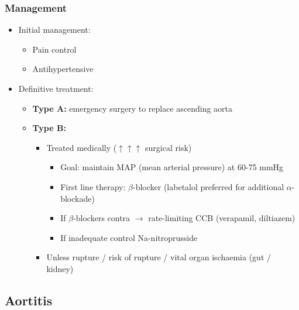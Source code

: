 \documentclass[
  12pt,
]{memoir}
\providecommand{\tightlist}{%
  \setlength{\itemsep}{0pt}\setlength{\parskip}{0pt}}
\begin{document}
\hypertarget{management-7}{%
\subsubsection{Management}\label{management-7}}

\begin{itemize}
\tightlist
\item
  Initial management:

  \begin{itemize}
  \tightlist
  \item
    Pain control
  \item
    Antihypertensive
  \end{itemize}
\item
  Definitive treatment:

  \begin{itemize}
  \tightlist
  \item
    \textbf{Type A:} emergency surgery to replace ascending aorta
  \item
    \textbf{Type B:}

    \begin{itemize}
    \tightlist
    \item
      Treated medically (\(\uparrow\uparrow\uparrow\) surgical risk)

      \begin{itemize}
      \tightlist
      \item
        Goal: maintain MAP (mean arterial pressure) at 60-75 mmHg
      \item
        First line therapy: \(\beta\)-blocker (labetalol preferred for
        additional \(\alpha\)-blockade)
      \item
        If \(\beta\)-blockers contra \(\rightarrow\) rate-limiting CCB
        (verapamil, diltiazem)
      \item
        If inadequate control Na-nitroprusside
      \end{itemize}
    \item
      Unless rupture / risk of rupture / vital organ ischaemia (gut /
      kidney)
    \end{itemize}
  \end{itemize}
\end{itemize}

\hypertarget{aortitis}{%
\subsection{Aortitis}\label{aortitis}}
\end{document}

